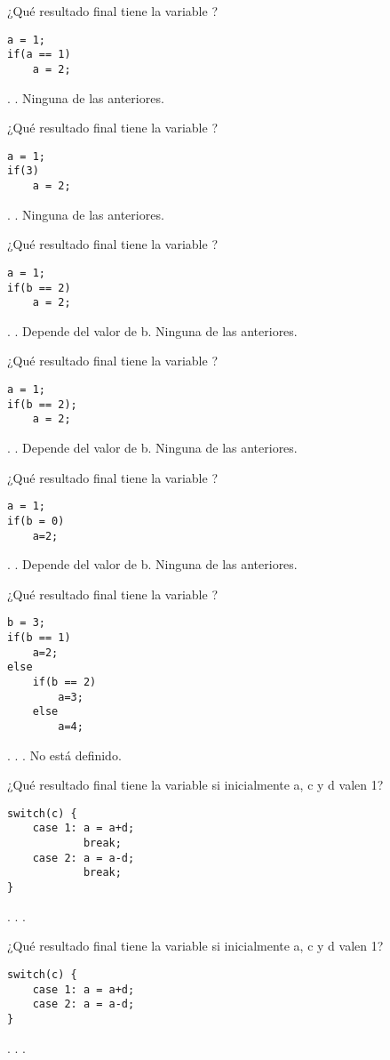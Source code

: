 \begin{preguntas}
\question ¿Qué resultado final tiene la variable ?
\begin{lstlisting}
a = 1; 
if(a == 1)
	a = 2;
\end{lstlisting}
.
.
\choice Ninguna de las anteriores.

\question ¿Qué resultado final tiene la variable ?
\begin{lstlisting}
a = 1; 
if(3)
	a = 2;
\end{lstlisting}
.
.
\choice Ninguna de las anteriores.

\question ¿Qué resultado final tiene la variable ?
\begin{lstlisting}
a = 1;
if(b == 2)
	a = 2;
\end{lstlisting}
.
.
\correctchoice Depende del valor de b.
\choice Ninguna de las anteriores.

\question ¿Qué resultado final tiene la variable ?
\begin{lstlisting}
a = 1;
if(b == 2);
	a = 2;
\end{lstlisting}
.
.
\choice Depende del valor de b.
\choice Ninguna de las anteriores.

\question ¿Qué resultado final tiene la variable ?
\begin{lstlisting}
a = 1;
if(b = 0)
    a=2;
\end{lstlisting}
.
.
\choice Depende del valor de b.
\choice Ninguna de las anteriores.

\question ¿Qué resultado final tiene la variable ?
\begin{lstlisting}
b = 3;
if(b == 1)
	a=2;
else 
	if(b == 2)
	 	a=3; 
	else 
		a=4;
\end{lstlisting}
. 
.
.
\choice No está definido.

\question ¿Qué resultado final tiene la variable  si inicialmente a, c y d valen 1?
\begin{lstlisting}
switch(c) {
	case 1: a = a+d;  
		    break;
	case 2: a = a-d;
			break;
}
\end{lstlisting}
.
.
.

\question ¿Qué resultado final tiene la variable  si inicialmente a, c y d valen 1?
\begin{lstlisting}
switch(c) {
	case 1: a = a+d;  
	case 2: a = a-d;
}
\end{lstlisting}
.
.
.


\end{preguntas}
